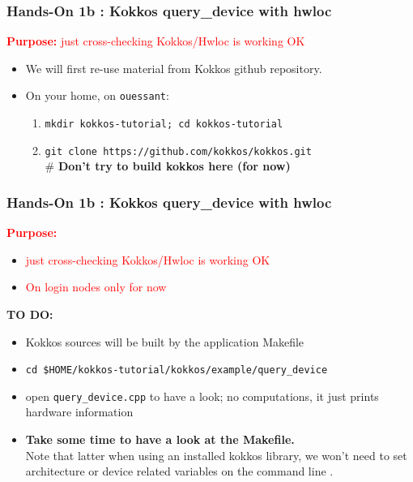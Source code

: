 \begin{frame}
  \frametitle{Hands-On 1b : Kokkos query\_device with hwloc}

  \hypertarget{handson1}{}
  {\large\textcolor{red}{\textbf{Purpose:} just cross-checking Kokkos/Hwloc is working OK}}

  \begin{itemize}
  \item We will first re-use material from Kokkos github repository.
  \item On your home, on \texttt{ouessant}: 
    \begin{enumerate}
    \item \texttt{mkdir kokkos-tutorial; cd kokkos-tutorial}
    \item \texttt{git clone https://github.com/kokkos/kokkos.git} \\
      \# \textbf{Don't try to build kokkos here (for now)}
    \end{enumerate}
  \end{itemize}

\end{frame}

\begin{frame}[fragile=singleslide]
  \frametitle{Hands-On 1b : Kokkos query\_device with hwloc}

  {\large\textcolor{red}{\textbf{Purpose:}}}
  \begin{itemize}
  \item \textcolor{red}{just cross-checking Kokkos/Hwloc is working OK}
  \item \textcolor{red}{On login nodes only for now}
  \end{itemize}
    
  {\bf TO DO:}
  \begin{itemize}
  \item Kokkos sources will be built by the application Makefile
  \item \texttt{cd \$HOME/kokkos-tutorial/kokkos/example/query\_device}
  \item open \texttt{query\_device.cpp} to have a look; no computations, it just prints hardware information
  \item \textbf{Take some time to have a look at the Makefile.}\\
    Note that latter when using an installed kokkos library, we won't need to set architecture or device related variables on the command line .
  \end{itemize}

\end{frame}

